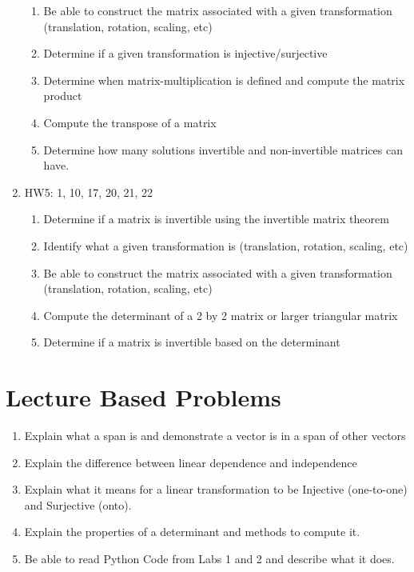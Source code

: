 \documentclass[12pt]{exam}
\begin{document}
\begin{enumerate}
\begin{enumerate}
        \item Be able to construct the matrix associated with a given transformation 
            (translation, rotation, scaling, etc)
        \item Determine if a given transformation is injective/surjective
        \item Determine when matrix-multiplication is defined and compute the matrix product
        \item Compute the transpose of a matrix
        \item Determine how many solutions invertible and non-invertible matrices can have.
    \end{enumerate}
    \item HW5: 1, 10, 17, 20, 21, 22
    \begin{enumerate}
        \item Determine if a matrix is invertible using the invertible matrix theorem
        \item Identify what a given transformation is (translation, rotation, scaling, etc)
        \item Be able to construct the matrix associated with a given transformation 
            (translation, rotation, scaling, etc)
        \item Compute the determinant of a 2 by 2 matrix or larger triangular matrix
        \item Determine if a matrix is invertible based on the determinant
    \end{enumerate}
\end{enumerate}
\section{Lecture Based Problems}
\begin{enumerate}
    \item Explain what a span is and demonstrate a vector is in a span of other vectors
    \item Explain the difference between linear dependence and independence
    \item Explain what it means for a linear transformation to be Injective (one-to-one) and 
        Surjective (onto).
    \item Explain the properties of a determinant and methods to compute it.
    \item Be able to read Python Code from Labs 1 and 2 and describe what it does.
\end{enumerate}
\end{document}
